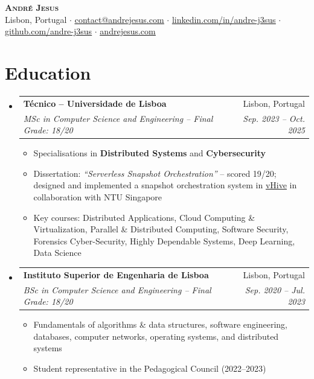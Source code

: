 \documentclass[letterpaper,11pt]{article}
\makeatletter
\newcommand{\resumeItem}[1]{
  \item\small{
    {#1 \vspace{-2pt}}
  }
}
\newcommand{\resumeSubheading}[4]{
  \vspace{-2pt}\item
    \begin{tabular*}{0.97\textwidth}[t]{l@{\extracolsep{\fill}}r}
      \textbf{#1} & #2 \\
      \textit{\small#3} & \textit{\small #4} \\
    \end{tabular*}\vspace{-7pt}
}
\newcommand{\resumeSubHeadingListStart}{\begin{itemize}[leftmargin=0.15in, label={}]}
\newcommand{\resumeSubHeadingListEnd}{\end{itemize}}
\newcommand{\resumeItemListStart}{\begin{itemize}}
\newcommand{\resumeItemListEnd}{\end{itemize}\vspace{-5pt}}
\makeatother
\begin{document}
\begin{center}
    \textbf{\Huge \scshape André Jesus} \\ \vspace{4pt}
    \small
    \faMapMarker* \hspace{1pt} Lisbon, Portugal
    \hspace{6pt}$\cdot$\hspace{6pt}
    \faEnvelope \hspace{1pt} \href{mailto:contact@andrejesus.com}{\underline{contact@andrejesus.com}}
    \hspace{6pt}$\cdot$\hspace{6pt}
    \faLinkedin \hspace{1pt} \href{https://linkedin.com/in/andre-j3sus}{\underline{linkedin.com/in/andre-j3sus}}
    \hspace{6pt}$\cdot$\hspace{6pt}
    \faGithub \hspace{1pt} \href{https://github.com/andre-j3sus}{\underline{github.com/andre-j3sus}}
    \hspace{6pt}$\cdot$\hspace{6pt}
    \faGlobe \hspace{1pt} \href{https://andrejesus.com}{\underline{andrejesus.com}}
\end{center}


\section{Education}
  \resumeSubHeadingListStart
    \resumeSubheading
      {T\'{e}cnico -- Universidade de Lisboa}{Lisbon, Portugal}
      {MSc in Computer Science and Engineering \textnormal{-- Final Grade: 18/20}}{Sep. 2023 -- Oct. 2025}
      \resumeItemListStart
        \resumeItem{Specialisations in \textbf{Distributed Systems} and \textbf{Cybersecurity}}
        \resumeItem{Dissertation: \emph{``Serverless Snapshot Orchestration''} -- scored 19/20; designed and implemented a snapshot orchestration system in \href{https://github.com/vhive-serverless/vHive}{vHive} in collaboration with NTU Singapore}
        \resumeItem{Key courses: Distributed Applications, Cloud Computing \& Virtualization, Parallel \& Distributed Computing, Software Security, Forensics Cyber-Security, Highly Dependable Systems, Deep Learning, Data Science}
      \resumeItemListEnd
    \resumeSubheading
      {Instituto Superior de Engenharia de Lisboa}{Lisbon, Portugal}
      {BSc in Computer Science and Engineering \textnormal{-- Final Grade: 18/20}}{Sep. 2020 -- Jul. 2023}
      \resumeItemListStart
        \resumeItem{Fundamentals of algorithms \& data structures, software engineering, databases, computer networks, operating systems, and distributed systems}
        \resumeItem{Student representative in the Pedagogical Council (2022--2023)}
      \resumeItemListEnd
  \resumeSubHeadingListEnd
\end{document}
